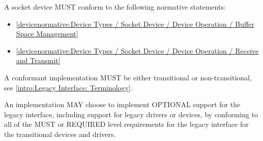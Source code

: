 \label{sec:Conformance / Device Conformance / Socket Device Conformance}

A socket device MUST conform to the following normative statements:

\begin{itemize}
\item \ref{devicenormative:Device Types / Socket Device / Device Operation / Buffer Space Management}
\item \ref{devicenormative:Device Types / Socket Device / Device Operation / Receive and Transmit}
\end{itemize}

\label{sec:Conformance / Legacy Interface: Transitional Device and Transitional Driver Conformance}
A conformant implementation MUST be either transitional or
non-transitional, see \ref{intro:Legacy
Interface: Terminology}.

An implementation MAY choose to implement OPTIONAL support for the
legacy interface, including support for legacy drivers
or devices, by conforming to all of the MUST or
REQUIRED level requirements for the legacy interface
for the transitional devices and drivers.

